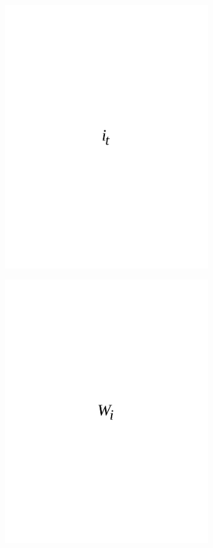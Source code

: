 \begin{figure}[H]
	\centering
	\includegraphics[width=0.8\textwidth]{media/ict/image53}
	\caption*{}
\end{figure}

\begin{figure}[H]
	\centering
	\includegraphics[width=0.8\textwidth]{media/ict/image54}
	\caption*{}
\end{figure}

